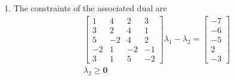 \documentclass[12pt]{article}
\begin{document}
\begin{enumerate}
\begin{enumerate}
                  \item The constraints of the associated dual are
                        \begin{gather*}
                              \begin{bmatrix}
                                    1  & 4  & 2  & 3  \\
                                    3  & 2  & 4  & 1  \\
                                    5  & -2 & 4  & 2  \\
                                    -2 & 1  & -2 & -1 \\
                                    3  & 1  & 5  & -2
                              \end{bmatrix}\lambda_1 - \lambda_2 = \begin{bmatrix}
                                    -7 \\ -6 \\ -5 \\ 2 \\ -3
                              \end{bmatrix} \\
                              \lambda_2 \ge \mathbf{0}
                        \end{gather*}


\end{enumerate}
\end{enumerate}
\end{document}
